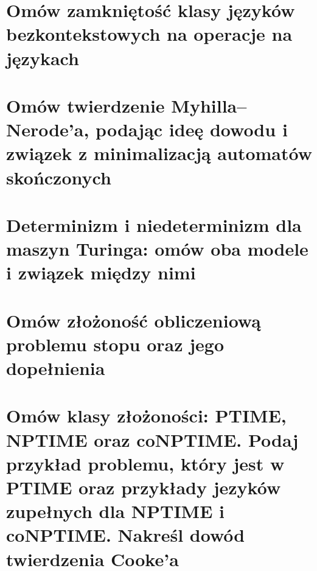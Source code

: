 \section{Omów zamkniętość klasy języków bezkontekstowych na operacje na językach}


\section{Omów twierdzenie Myhilla–Nerode’a, podając ideę dowodu i związek z minimalizacją automatów skończonych}


\section{Determinizm i niedeterminizm dla maszyn Turinga: omów oba modele i związek
między nimi}



\section{Omów złożoność obliczeniową problemu stopu oraz jego dopełnienia}


\section{Omów klasy złożoności: PTIME, NPTIME oraz coNPTIME. Podaj przykład
problemu, który jest w PTIME oraz przykłady jezyków zupełnych dla NPTIME i coNPTIME.
Nakreśl dowód twierdzenia Cooke’a}
